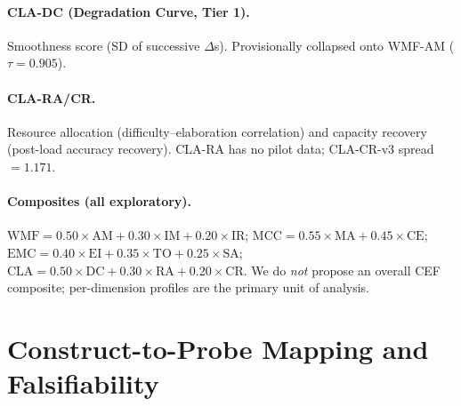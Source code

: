 \documentclass{article}
\begin{document}
\paragraph{CLA-DC (Degradation Curve, Tier 1).}
Smoothness score (SD of successive $\Delta$s). Provisionally collapsed
onto WMF-AM ($\tau = 0.905$).

\paragraph{CLA-RA/CR.}
Resource allocation (difficulty--elaboration correlation) and capacity
recovery (post-load accuracy recovery). CLA-RA has no pilot data;
CLA-CR-v3 spread $= 1.171$.

\paragraph{Composites (all exploratory).}
$\text{WMF} = 0.50 \times \text{AM} + 0.30 \times \text{IM} + 0.20 \times \text{IR}$;
$\text{MCC} = 0.55 \times \text{MA} + 0.45 \times \text{CE}$;
$\text{EMC} = 0.40 \times \text{EI} + 0.35 \times \text{TO} + 0.25 \times \text{SA}$;
$\text{CLA} = 0.50 \times \text{DC} + 0.30 \times \text{RA} + 0.20 \times \text{CR}$.
We do \emph{not} propose an overall CEF composite; per-dimension profiles
are the primary unit of analysis.

\section{Construct-to-Probe Mapping and Falsifiability}
\label{app:falsify}
\end{document}
